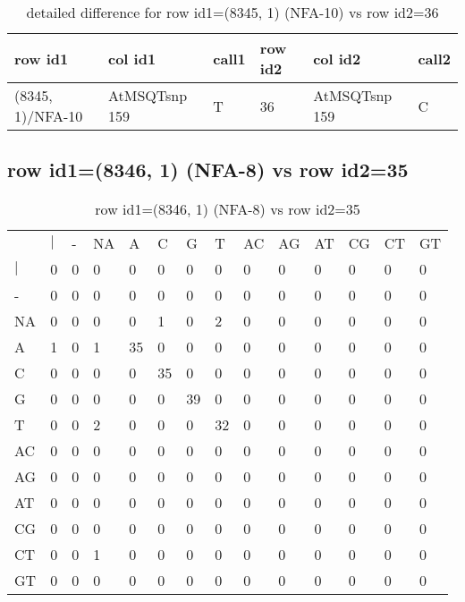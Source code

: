 \begin{center}
\begin{longtable}{|l|l|l|l|l|l|}
\caption{detailed difference for row id1=(8345, 1) (NFA-10) vs row id2=36} \label{table_dm357}\\
\hline
row id1&col id1&call1&row id2&col id2&call2\\
\hline
(8345, 1)/NFA-10&AtMSQTsnp 159&T&36&AtMSQTsnp 159&C\\
\hline
\end{longtable}
\end{center}

\subsection{row id1=(8346, 1) (NFA-8) vs row id2=35}
\begin{center}
\begin{longtable}{|l|l|l|l|l|l|l|l|l|l|l|l|l|l|}
\caption{row id1=(8346, 1) (NFA-8) vs row id2=35} \label{table_dm358}\\
\hline
\\
\hline
&$|$&-&NA&A&C&G&T&AC&AG&AT&CG&CT&GT\\
$|$&0&0&0&0&0&0&0&0&0&0&0&0&0\\
-&0&0&0&0&0&0&0&0&0&0&0&0&0\\
NA&0&0&0&0&1&0&2&0&0&0&0&0&0\\
A&1&0&1&35&0&0&0&0&0&0&0&0&0\\
C&0&0&0&0&35&0&0&0&0&0&0&0&0\\
G&0&0&0&0&0&39&0&0&0&0&0&0&0\\
T&0&0&2&0&0&0&32&0&0&0&0&0&0\\
AC&0&0&0&0&0&0&0&0&0&0&0&0&0\\
AG&0&0&0&0&0&0&0&0&0&0&0&0&0\\
AT&0&0&0&0&0&0&0&0&0&0&0&0&0\\
CG&0&0&0&0&0&0&0&0&0&0&0&0&0\\
CT&0&0&1&0&0&0&0&0&0&0&0&0&0\\
GT&0&0&0&0&0&0&0&0&0&0&0&0&0\\
\hline
\end{longtable}
\end{center}

